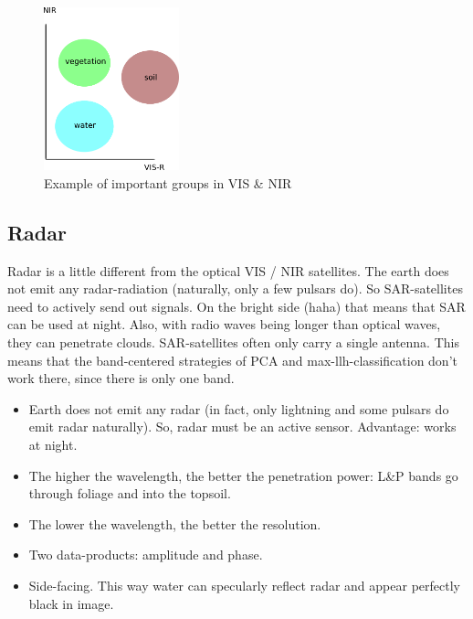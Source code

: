 \begin{figure}[H]
    \caption{Example of important groups in VIS \& NIR}
    \centering
      \includegraphics[width=0.35\textwidth]{images/rs_vis_nir_groups.png}
\end{figure}


\subsection{Radar}
Radar is a little different from the optical VIS / NIR satellites.
The earth does not emit any radar-radiation (naturally, only a few pulsars do). So SAR-satellites need to actively send out signals.
On the bright side (haha) that means that SAR can be used at night. Also, with radio waves being longer than optical waves, they can penetrate clouds.
SAR-satellites often only carry a single antenna. This means that the band-centered strategies of PCA and max-llh-classification don't work there, since there is only one band.


\begin{itemize}
    \item Earth does not emit any radar (in fact, only lightning and some pulsars do emit radar naturally). So, radar must be an active sensor. Advantage: works at night.
    \item The higher the wavelength, the better the penetration power: L&P bands go through foliage and into the topsoil.
    \item The lower the wavelength, the better the resolution.
    \item Two data-products: amplitude and phase.
    \item Side-facing. This way water can specularly reflect radar and appear perfectly black in image.
\end{itemize}




